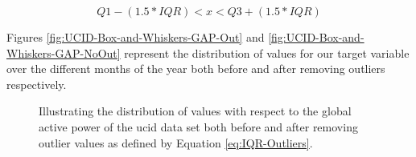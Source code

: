 \begin{adjustwidth}{-1.65cm}{-0.0cm}
\begin{enumerate}[label=Step 3.\arabic*:, leftmargin=*]
    \begin{equation}
        Q1 - (1.5 * IQR) < x < Q3 + (1.5 * IQR)
    \label{eq:IQR-Outliers}
    \end{equation}
    
    \noindent \newline Figures \ref{fig:UCID-Box-and-Whiskers-GAP-Out} and \ref{fig:UCID-Box-and-Whiskers-GAP-NoOut} represent the distribution of values for our target variable over the different months of the year both before and after removing outliers respectively.

    
    \begin{figure}[hbt!]
        \begin{adjustwidth}{-3.0cm}{-3.0cm}%
                \myfloatalign
                 \quad
                 \quad
                \caption{Illustrating the distribution of values with respect to the global active power of the \gls{ucid} data set both before and after removing outlier values as defined by Equation \ref{eq:IQR-Outliers}.}
        \end{adjustwidth}
    \end{figure}
    

\end{enumerate}
\end{adjustwidth}
